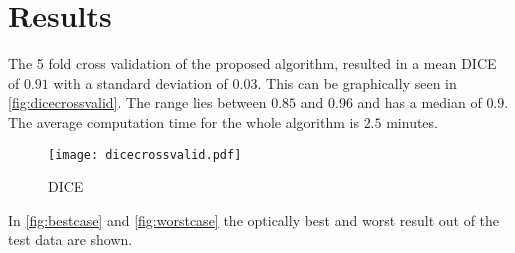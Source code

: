 \section{Results}
The 5 fold cross validation of the proposed algorithm, resulted in a mean DICE of $0.91$ with a standard deviation of $0.03$. This can be graphically seen in \autoref{fig:dicecrossvalid}. The range lies between $0.85$ and $0.96$ and has a median of $0.9$. The average computation time for the whole algorithm is $2.5$ minutes.
\begin{figure}[h]
\centering
\texttt{[image: dicecrossvalid.pdf]}
\caption{DICE}
\label{fig:dicecrossvalid}
\end{figure}

In \autoref{fig:bestcase} and \autoref{fig:worstcase} the optically best and worst result out of the test data are shown.
\begin{figure*}[!t]
	\centering
	\hfil
\end{figure*}
